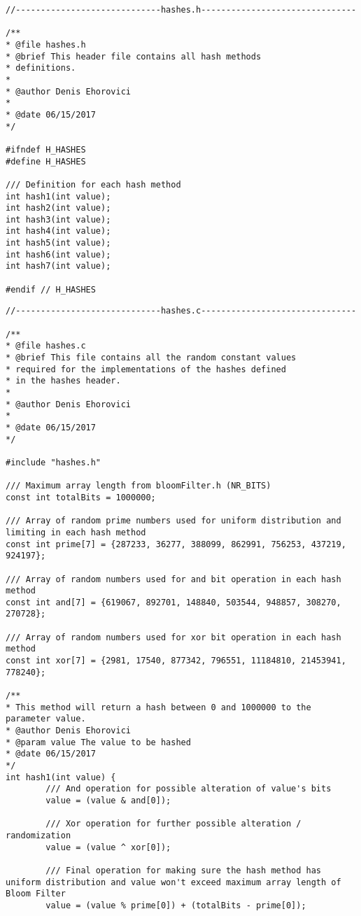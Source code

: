 \documentclass[14pt]{article}
\begin{document}
\begin{lstlisting}
//-----------------------------hashes.h-------------------------------

/**
* @file hashes.h
* @brief This header file contains all hash methods
* definitions.
*
* @author Denis Ehorovici
*
* @date 06/15/2017
*/

#ifndef H_HASHES
#define H_HASHES

/// Definition for each hash method
int hash1(int value);
int hash2(int value);
int hash3(int value);
int hash4(int value);
int hash5(int value);
int hash6(int value);
int hash7(int value);

#endif // H_HASHES

\end{lstlisting}
\begin{lstlisting}
//-----------------------------hashes.c-------------------------------

/**
* @file hashes.c
* @brief This file contains all the random constant values
* required for the implementations of the hashes defined
* in the hashes header.
*
* @author Denis Ehorovici
*
* @date 06/15/2017
*/

#include "hashes.h"

/// Maximum array length from bloomFilter.h (NR_BITS)
const int totalBits = 1000000;

/// Array of random prime numbers used for uniform distribution and limiting in each hash method
const int prime[7] = {287233, 36277, 388099, 862991, 756253, 437219, 924197};

/// Array of random numbers used for and bit operation in each hash method
const int and[7] = {619067, 892701, 148840, 503544, 948857, 308270, 270728};

/// Array of random numbers used for xor bit operation in each hash method
const int xor[7] = {2981, 17540, 877342, 796551, 11184810, 21453941, 778240};

/**
* This method will return a hash between 0 and 1000000 to the parameter value.
* @author Denis Ehorovici
* @param value The value to be hashed
* @date 06/15/2017
*/
int hash1(int value) {
        /// And operation for possible alteration of value's bits
        value = (value & and[0]);

        /// Xor operation for further possible alteration / randomization
        value = (value ^ xor[0]);

        /// Final operation for making sure the hash method has uniform distribution and value won't exceed maximum array length of Bloom Filter
        value = (value % prime[0]) + (totalBits - prime[0]);


\end{lstlisting}
\end{document}
